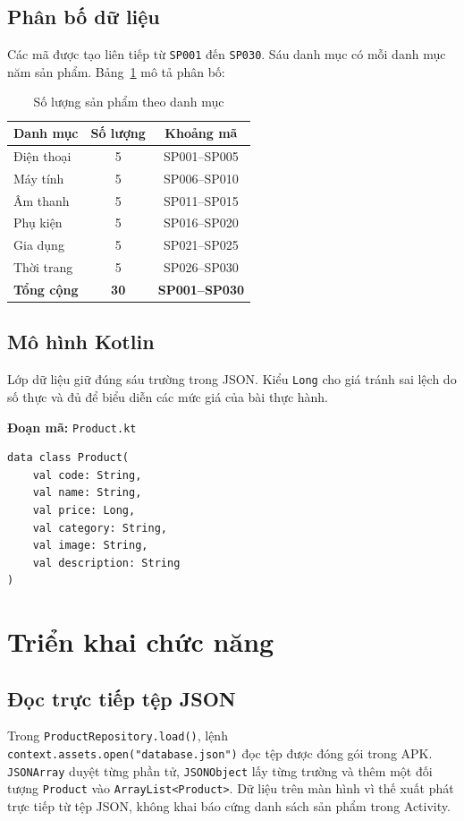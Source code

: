 \documentclass[12pt,a4paper]{article}
\newcommand{\codepath}[1]{\nolinkurl{#1}}
\newcommand{\codecaption}[1]{\par\noindent\textbf{Đoạn mã:} #1\par\vspace{3pt}}
\begin{document}
\subsection{Phân bố dữ liệu}
Các mã được tạo liên tiếp từ \texttt{SP001} đến \texttt{SP030}. Sáu danh mục có
mỗi danh mục năm sản phẩm. Bảng~\ref{tab:categories} mô tả phân bố:
\begin{table}[H]
\centering
\caption{Số lượng sản phẩm theo danh mục}
\label{tab:categories}
\begin{tabular}{@{}lcc@{}}
\toprule
\textbf{Danh mục} & \textbf{Số lượng} & \textbf{Khoảng mã}\\
\midrule
Điện thoại & 5 & SP001--SP005\\
Máy tính & 5 & SP006--SP010\\
Âm thanh & 5 & SP011--SP015\\
Phụ kiện & 5 & SP016--SP020\\
Gia dụng & 5 & SP021--SP025\\
Thời trang & 5 & SP026--SP030\\
\midrule
\textbf{Tổng cộng} & \textbf{30} & \textbf{SP001--SP030}\\
\bottomrule
\end{tabular}
\end{table}

\subsection{Mô hình Kotlin}
Lớp dữ liệu giữ đúng sáu trường trong JSON. Kiểu \texttt{Long} cho giá tránh
sai lệch do số thực và đủ để biểu diễn các mức giá của bài thực hành.
\codecaption{\codepath{Product.kt}}
\begin{Verbatim}[fontsize=\small,breaklines=true,frame=single]
data class Product(
    val code: String,
    val name: String,
    val price: Long,
    val category: String,
    val image: String,
    val description: String
)
\end{Verbatim}

\section{Triển khai chức năng}
\subsection{Đọc trực tiếp tệp JSON}
Trong \texttt{ProductRepository.load()}, lệnh \texttt{context.assets.open("database.json")}
đọc tệp được đóng gói trong APK. \texttt{JSONArray} duyệt từng phần tử,
\texttt{JSONObject} lấy từng trường và thêm một đối tượng \texttt{Product}
vào \texttt{ArrayList<Product>}. Dữ liệu trên màn hình vì thế xuất phát trực tiếp
từ tệp JSON, không khai báo cứng danh sách sản phẩm trong Activity.
\end{document}
